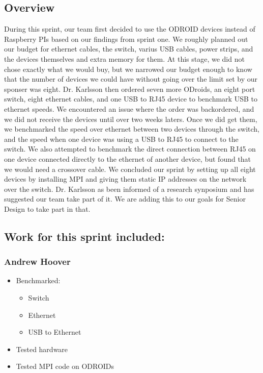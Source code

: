 \subsection*{Overview}
During this sprint, our team first decided to use the ODROID devices instead of Raspberry PIs based on our findings from sprint one. We roughly planned out our budget for ethernet cables, the switch, varius USB cables, power strips, and the devices themselves and extra memory for them. At this stage, we did not chose exactly what we would buy, but we narrowed our budget enough to know that the number of devices we could have without going over the limit set by our sponser was eight. Dr. Karlsson then ordered seven more ODroids, an eight port switch, eight ethernet cables, and one USB to RJ45 device to benchmark USB to ethernet speeds. We encountered an issue where the order was backordered, and we did not receive the devices until over two weeks laters. Once we did get them, we benchmarked the speed over ethernet between two devices through the switch, and the speed when one device was using a USB to RJ45 to connect to the switch. We also attempted to benchmark the direct connection between RJ45 on one device connected directly to the ethernet of another device, but found that we would need a crossover cable. We concluded our sprint by setting up all eight devices by installing MPI and giving them static IP addresses on the network over the switch. \newline \newline Dr. Karlsson as been informed of a research synposium and has suggested our team take part of it. We are adding this to our goals for Senior Design to take part in that.

\subsection*{Work for this sprint included:}

\subsubsection*{Andrew Hoover}
\begin{itemize}
	\item Benchmarked:
		\begin{itemize}
			\item Switch
			\item Ethernet
			\item USB to Ethernet
		\end{itemize}
	\item Tested hardware
	\item Tested MPI code on ODROIDs
\end{itemize}

